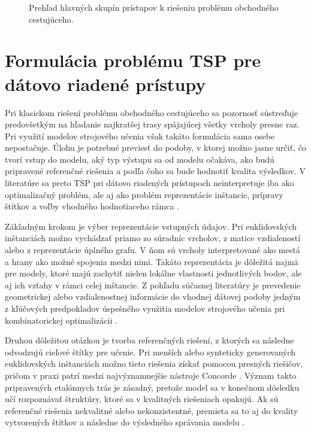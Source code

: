 \begin{figure}[H]
    \centering
    
    \caption{Prehľad hlavných skupín prístupov k riešeniu problému obchodného
             cestujúceho.}
    \label{fig:tsp_methods}
\end{figure}

\section{Formulácia problému TSP pre dátovo riadené prístupy}

Pri klasickom riešení problému obchodného cestujúceho sa pozornosť sústreďuje
predovšetkým na hľadanie najkratšej trasy spájajúcej všetky vrcholy presne raz.
Pri využití modelov strojového učenia však takáto formulácia sama osebe
nepostačuje. Úlohu je potrebné previesť do podoby, v ktorej možno jasne určiť,
čo tvorí vstup do modelu, aký typ výstupu sa od modelu očakáva, ako budú
pripravené referenčné riešenia a podľa čoho sa bude hodnotiť kvalita výsledkov.
V literatúre sa preto TSP pri dátovo riadených prístupoch neinterpretuje iba
ako optimalizačný problém, ale aj ako problém reprezentácie inštancie,
prípravy štítkov a voľby vhodného hodnotiaceho rámca
\parencite{bengio2021mlco,joshi2022generalization}.

Základným krokom je výber reprezentácie vstupných údajov. Pri euklidovských
inštanciách možno vychádzať priamo zo súradníc vrcholov, z matice vzdialeností
alebo z reprezentácie úplného grafu. V ňom sú vrcholy interpretované ako mestá
a hrany ako možné spojenia medzi nimi. Takáto reprezentácia je dôležitá najmä
pre modely, ktoré majú zachytiť nielen lokálne vlastnosti jednotlivých bodov,
ale aj ich vzťahy v rámci celej inštancie. Z pohľadu súčasnej literatúry je
prevedenie geometrickej alebo vzdialenostnej informácie do vhodnej dátovej
podoby jedným z kľúčových predpokladov úspešného využitia modelov strojového
učenia pri kombinatorickej optimalizácii
\parencite{bengio2021mlco,cappart2023gnnco,joshi2022generalization}.

Druhou dôležitou otázkou je tvorba referenčných riešení, z ktorých sa následne
odvodzujú cieľové štítky pre učenie. Pri menších alebo synteticky generovaných
euklidovských inštanciách možno tieto riešenia získať pomocou presných
riešičov, pričom v praxi patrí medzi najvýznamnejšie nástroje Concorde
\parencite{concorde2003solver}. Význam takto pripravených etalónnych trás je
zásadný, pretože model sa v konečnom dôsledku učí rozpoznávať štruktúry, ktoré
sa v kvalitných riešeniach opakujú. Ak sú referenčné riešenia nekvalitné alebo
nekonzistentné, premieta sa to aj do kvality vytvorených štítkov a následne do
výsledného správania modelu \parencite{joshi2022generalization,bengio2021mlco}.

